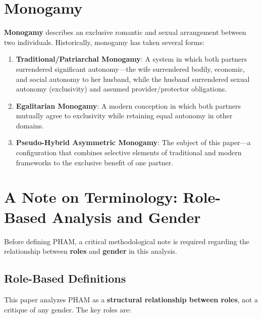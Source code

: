 \documentclass[12pt,openany]{book}
\numberwithin{equation}{chapter}
\begin{document}
\section{Monogamy}

\textbf{Monogamy} describes an exclusive romantic and sexual arrangement between two individuals. Historically, monogamy has taken several forms:

\begin{enumerate}[label=(\alph*)]
    \item \textbf{Traditional/Patriarchal Monogamy}: A system in which both partners surrendered significant autonomy---the wife surrendered bodily, economic, and social autonomy to her husband, while the husband surrendered sexual autonomy (exclusivity) and assumed provider/protector obligations.
    \item \textbf{Egalitarian Monogamy}: A modern conception in which both partners mutually agree to exclusivity while retaining equal autonomy in other domains.
    \item \textbf{Pseudo-Hybrid Asymmetric Monogamy}: The subject of this paper---a configuration that combines selective elements of traditional and modern frameworks to the exclusive benefit of one partner.
\end{enumerate}

\section{A Note on Terminology: Role-Based Analysis and Gender}

Before defining PHAM, a critical methodological note is required regarding the relationship between \textbf{roles} and \textbf{gender} in this analysis.

\subsection{Role-Based Definitions}

This paper analyzes PHAM as a \textbf{structural relationship between roles}, not a critique of any gender. The key roles are:
\end{document}
